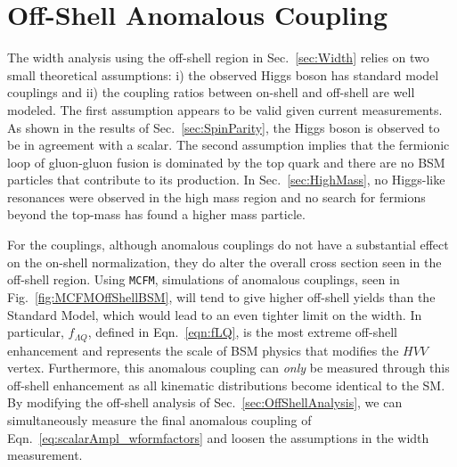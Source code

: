 \section{Off-Shell Anomalous Coupling}
\label{sec:OffShellAnom}

The width analysis using the off-shell region in Sec.~\ref{sec:Width} relies on two small theoretical assumptions: i) the observed Higgs boson has standard model couplings and ii) the coupling ratios between on-shell and off-shell are well modeled. The first assumption appears to be valid given current measurements. As shown in the results of Sec.~\ref{sec:SpinParity}, the Higgs boson is observed to be in agreement with a scalar. The second assumption implies that the fermionic loop of gluon-gluon fusion is dominated by the top quark and there are no BSM particles that contribute to its production. In Sec.~\ref{sec:HighMass}, no Higgs-like resonances were observed in the high mass region and no search \cite{} for fermions beyond the top-mass has found a higher mass particle.

For the couplings, although anomalous couplings do not have a substantial effect on the on-shell normalization, they do alter the overall cross section seen in the off-shell region. Using {\tt MCFM}, simulations of anomalous couplings, seen in Fig.~\ref{fig:MCFMOffShellBSM}, will tend to give higher off-shell yields than the Standard Model, which would lead to an even tighter limit on the width. In particular, $f_{\Lambda Q}$, defined in Eqn.~\ref{eqn:fLQ}, is the most extreme off-shell enhancement and represents the scale of BSM physics that modifies the $HVV$ vertex. Furthermore, this anomalous coupling can \textit{only} be measured through this off-shell enhancement as all kinematic distributions become identical to the SM. By modifying the off-shell analysis of Sec.~\ref{sec:OffShellAnalysis}, we can simultaneously measure the final anomalous coupling of Eqn.~\ref{eq:scalarAmpl_wformfactors} and loosen the assumptions in the width measurement.

